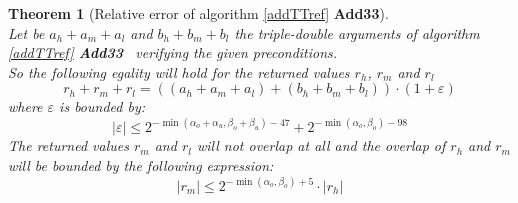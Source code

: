 \documentclass[a4paper,10pt,twoside]{article}
\newtheorem{theorem}{Theorem}[section]
\newcommand{\hi}{\ensuremath{\mathit{h}}}
\newcommand{\mi}{\ensuremath{\mathit{m}}}
\newcommand{\lo}{\ensuremath{\mathit{l}}}
\newcommand{\AddTT}{{\bf Add33}}
\renewcommand{\epsilon}{\varepsilon}
\begin{document}
\begin{theorem}[Relative error of algorithm \ref{addTTref} \AddTT\label{theoAddTT}] ~ \\
Let be $a_\hi + a_\mi + a_\lo$ and $b_\hi + b_\mi + b_\lo$ the triple-double
arguments of algorithm \ref{addTTref} \AddTT~ verifying the given 
preconditions.\\
So the following egality will hold for the returned values $r_\hi$, $r_\mi$ and $r_\lo$ 
$$r_\hi + r_\mi + r_\lo = \left(\left(a_\hi + a_\mi + a_\lo \right) + \left( b_\hi + b_\mi + b_\lo \right)\right) \cdot \left(1 + \epsilon\right)$$
where $\epsilon$ is bounded by:
$$\left \vert \epsilon \right \vert \leq 2^{-\min\left(\alpha_o + \alpha_u,\beta_o + \beta_u\right) - 47} + 
2^{-\min\left( \alpha_o, \beta_o\right) - 98}$$
The returned values $r_\mi$ and $r_\lo$ will not overlap at all and the
overlap of $r_\hi$ and $r_\mi$ will be bounded by the following expression:
$$\left \vert r_\mi \right \vert \leq 2^{-\min\left( \alpha_o, \beta_o \right) + 5} \cdot \left \vert r_\hi \right \vert$$
\end{theorem}
\end{document}
